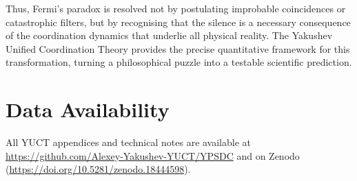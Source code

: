 \documentclass[12pt,a4paper]{article}
\begin{document}
	Thus, Fermi's paradox is resolved not by postulating improbable
	coincidences or catastrophic filters, but by recognising that the
	silence is a necessary consequence of the coordination dynamics that
	underlie all physical reality.  The Yakushev Unified Coordination
	Theory provides the precise quantitative framework for this
	transformation, turning a philosophical puzzle into a testable
	scientific prediction.
	
	\section*{Data Availability}
	All YUCT appendices and technical notes are available at
	\url{https://github.com/Alexey-Yakushev-YUCT/YPSDC} and on Zenodo
	(\url{https://doi.org/10.5281/zenodo.18444598}).
	
\end{document}
